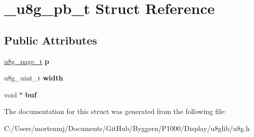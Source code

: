 \hypertarget{struct__u8g__pb__t}{\section{\-\_\-u8g\-\_\-pb\-\_\-t Struct Reference}
\label{struct__u8g__pb__t}
}
\subsection*{Public Attributes}
\begin{DoxyCompactItemize}
\item 
\hypertarget{struct__u8g__pb__t_a4b77abbf8851fe89ee4228dab1c9b078}{\hyperlink{struct__u8g__page__t}{u8g\-\_\-page\-\_\-t} {\bfseries p}}\label{struct__u8g__pb__t_a4b77abbf8851fe89ee4228dab1c9b078}

\item 
\hypertarget{struct__u8g__pb__t_a4b4085697ca3e290568a8eae160c72d6}{u8g\-\_\-uint\-\_\-t {\bfseries width}}\label{struct__u8g__pb__t_a4b4085697ca3e290568a8eae160c72d6}

\item 
\hypertarget{struct__u8g__pb__t_a4ed9fd4efeaaa69017b5b106dd7d4ca6}{void $\ast$ {\bfseries buf}}\label{struct__u8g__pb__t_a4ed9fd4efeaaa69017b5b106dd7d4ca6}

\end{DoxyCompactItemize}


The documentation for this struct was generated from the following file\-:\begin{DoxyCompactItemize}
\item 
C\-:/\-Users/mortenmj/\-Documents/\-Git\-Hub/\-Byggern/\-P1000/\-Display/u8glib/u8g.\-h\end{DoxyCompactItemize}

